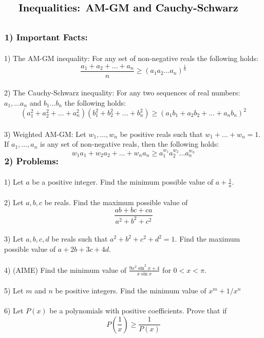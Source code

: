 \documentclass{article}
\begin{document}
$\centerline{\Large \textbf{Inequalities: AM-GM and Cauchy-Schwarz}}$
\\
\\
\\
$\large \textbf{1)  Important Facts:}$  \\
\\
1) The AM-GM inequality: For any set of non-negative reals the following holds:
\begin{equation*}
\frac{a_1+a_2+\ldots+a_n}{n}\ge (a_1a_2\ldots a_n)^{\frac{1}{n}}
\end{equation*}
\\
2) The Cauchy-Schwarz inequality: For any two sequences of real numbers: $a_1,\ldots a_n$ and $b_1\ldots b_n$ the following holds:
\begin{equation*}
(a_1^2+a_2^2+\ldots+a_n^2)(b_1^2+b_2^2+\ldots+b_n^2) \ge (a_1b_1+a_2b_2+\ldots+a_nb_n)^2
\end{equation*}
\\
3) Weighted AM-GM: Let $w_1,\ldots, w_n$ be positive reals such that $w_1+\ldots+w_n=1$. If $a_1,\ldots,a_n$ is any set of non-negative reals, then the following holds:
\begin{equation*}
w_1a_1+w_2a_2+\ldots+w_na_n\ge a_1^{w_1}a_2^{w_2}\ldots a_n^{w_n}
\end{equation*}
$\large \textbf{2)  Problems:}$  \\
\\
1) Let $a$ be a positive integer. Find the minimum possible value of $a+\frac{1}{a}$.
\\
\\
2) Let $a,b,c$ be reals. Find the maximum possible value of 
\begin{equation*}
\frac{ab+bc+ca}{a^2+b^2+c^2}
\end{equation*}
\\
3) Let $a,b,c,d$ be reals such that $a^2+b^2+c^2+d^2=1$. Find the maximum possible value of $a+2b+3c+4d$.
\\
\\
4) (AIME) Find the minimum value of $\displaystyle\frac{9x^2\sin^2x+4}{x\sin x}$ for $0<x<\pi$.
\\
\\
5) Let $m$ and $n$ be positive integers. Find the minimum value of $x^m+1/x^n$
\\
\\
6) Let $P(x)$ be a polynomials with positive coefficients. Prove that if 
\begin{equation*}
P\left(\frac{1}{x}\right) \ge \frac{1}{P(x)}
\end{equation*}
\end{document}
